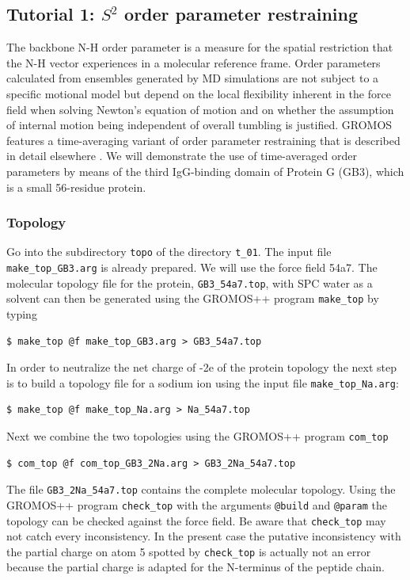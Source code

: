 
\subsection{Tutorial 1: $S^2$ order parameter restraining}
The backbone N-H order parameter is a measure for the spatial restriction that the N-H vector experiences in a molecular reference frame. 
Order parameters calculated from ensembles generated by MD simulations are not subject to a specific motional model but depend on the 
local flexibility inherent in the force field when solving Newton's equation of motion and on whether the assumption of internal motion 
being independent of overall tumbling is justified. 
GROMOS features a time-averaging variant of order parameter restraining that is described in detail elsewhere \cite{Hansen_S2_2014}. 
We will demonstrate the use of time-averaged order parameters by means of the third IgG-binding domain of Protein G (GB3), which is a small 56-residue protein.

\subsubsection{Topology}
Go into the subdirectory \texttt{topo} of the directory \texttt{t\_01}. The input file \texttt{make\_top\_GB3.arg} is already prepared. We will use the force field 54a7. 
The molecular topology file for the protein, \texttt{GB3\_54a7.top}, with SPC water as a solvent can then be generated using the GROMOS++ program \texttt{make\_top} 
by typing
\begin{lstlisting}
$ make_top @f make_top_GB3.arg > GB3_54a7.top
\end{lstlisting}
In order to neutralize the net charge of -2e of the protein topology the next step is to build a topology file for a sodium ion using the input file \texttt{make\_top\_Na.arg}:
\begin{lstlisting}
$ make_top @f make_top_Na.arg > Na_54a7.top
\end{lstlisting}
Next we combine the two topologies using the GROMOS++ program \texttt{com\_top}
\begin{lstlisting}
$ com_top @f com_top_GB3_2Na.arg > GB3_2Na_54a7.top
\end{lstlisting}
The file \texttt{GB3\_2Na\_54a7.top} contains the complete molecular topology. Using the GROMOS++ program \texttt{check\_top} with the arguments \texttt{@build} and \texttt{@param} the topology can be checked against the force field. Be aware that \texttt{check\_top} may not catch every inconsistency. In the present case the putative inconsistency with the partial charge on atom 5 spotted by \texttt{check\_top} is 
actually not an error because the partial charge is adapted for the N-terminus of the peptide chain.

